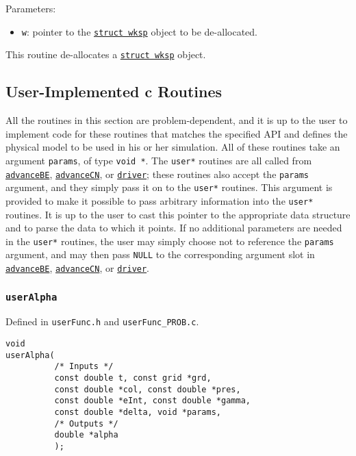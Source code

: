 \documentclass[12pt]{article}
\begin{document}
Parameters:
\begin{itemize}
\item \texttt{w}: pointer to the \hyperref[sssec:datastructures]{\texttt{struct wksp}} object to be de-allocated.
\end{itemize}

This routine de-allocates a \hyperref[sssec:datastructures]{\texttt{struct wksp}} object.


\subsection{User-Implemented c Routines}
\label{ssec:userC}

All the routines in this section are problem-dependent, and it is up to the user to implement code for these routines that matches the specified API and defines the physical model to be used in his or her simulation. All of these routines take an argument \verb=params=, of type \verb=void *=. The \verb=user*= routines are all called from \hyperref[sssec:advanceBE]{\texttt{advanceBE}}, \hyperref[sssec:advanceCN]{\texttt{advanceCN}}, or \hyperref[sssec:driver]{\texttt{driver}}; these routines also accept the \verb=params= argument, and they simply pass it on to the \verb=user*= routines. This argument is provided to make it possible to pass arbitrary information into the \verb=user*= routines. It is up to the user to cast this pointer to the appropriate data structure and to parse the data to which it points. If no additional parameters are needed in the \verb=user*= routines, the user may simply choose not to reference the \verb=params= argument, and may then pass \verb=NULL= to the corresponding argument slot in \hyperref[sssec:advanceBE]{\texttt{advanceBE}}, \hyperref[sssec:advanceCN]{\texttt{advanceCN}}, or \hyperref[sssec:driver]{\texttt{driver}}.

\subsubsection{\texttt{userAlpha}}
\label{sssec:userAlpha}

Defined in \verb=userFunc.h= and \verb=userFunc_PROB.c=.

\begin{verbatim}
void
userAlpha(
          /* Inputs */
          const double t, const grid *grd, 
          const double *col, const double *pres,
          const double *eInt, const double *gamma, 
          const double *delta, void *params,
          /* Outputs */
          double *alpha
          );
\end{verbatim}
\end{document}
